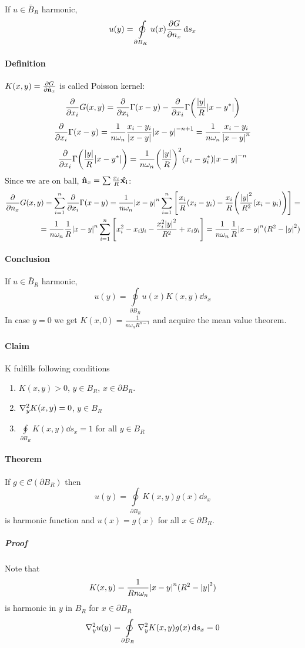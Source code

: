 If $u \in \bar{B}_R$ harmonic,
$$u(y) = \oint\limits_{\partial B_R} u(x) \pdv{G}{n_x} (x,y) \dd{s_x}$$

\paragraph{Definition} $K(x,y) = \pdv{G}{\vu{n}_x} (x,y)$ is called Poisson kernel:
$$\pdv{x_i} G(x,y) = \pdv{x_i} \Gamma(x-y) - \pdv{x_i} \Gamma\qty(\frac{\abs{y}}{R} \abs{x-y^*})$$
$$\pdv{x_i} \Gamma(x-y) = \frac{1}{n\omega_n} \frac{x_i-y_i}{\abs{x-y}} \abs{x-y}^{-n+1} = \frac{1}{n\omega_n}\frac{x_i-y_i}{\abs{x-y}^n}$$ 
$$\pdv{x_i} \Gamma\qty(\frac{\abs{y}}{R} \abs{x-y^*}) = \frac{1}{n\omega_n} \qty(\frac{\abs{y}}{R})^2 (x_i - y^*_i) \abs{x-y}^{-n}$$
Since we are on ball, $\vu{n}_x = \sum \frac{x_i}{R} \vu{x_i}$:
\begin{align*}
\pdv{n_x} G(x,y) = \sum_{i=1}^n \pdv{x_i} \Gamma(x-y) = \frac{1}{n\omega_n} \abs{x-y}^n \sum_{i=1}^n \qty[\frac{x_i}{R}(x_i-y_i) - \frac{x_i}{R}\qty(\frac{\abs{y}^2}{R^2}(x_i-y_i)) ]  =\\= \frac{1}{n\omega_n} \frac{1}{R}\abs{x-y}^n \sum_{i=1}^n \qty[x_i^2 - x_iy_i - \frac{x_i^2\abs{y}^2}{R^2} + x_iy_i ] = \frac{1}{n\omega_n} \frac{1}{R}\abs{x-y}^n(R^2-\abs{y}^2)
\end{align*}
\paragraph{Conclusion}
If $u \in \bar{B}_R$ harmonic,
$$u(y) = \oint\limits_{\partial B_R} u(x) K (x,y) \dd{s_x}$$
In case $y=0$ we get $K(x,0) = \frac{1}{n\omega_n R^{n-1}}$ and acquire the mean value theorem.

\paragraph{Claim}
K fulfills following conditions
\begin{enumerate}
	\item $K(x,y)>0$, $y\in B_R$, $x\in \partial B_R$.
	\item $\laplacian_y K(x,y) = 0$, $y\in B_R$
	\item $\oint\limits_{\partial B_R}  K (x,y) \dd{s_x} = 1$ for all $y\in B_R$
\end{enumerate}

\paragraph{Theorem}
If $g \in \mathcal{C}(\partial B_R)$ then 
$$u(y) = \oint\limits_{\partial B_R}  K (x,y)g(x) \dd{s_x}$$
is harmonic function and $u(x) = g(x) $ for all $x\in \partial B_R$.
\subparagraph{Proof}
Note that
$$K(x,y) = \frac{1}{Rn\omega_n}\abs{x-y}^n(R^2-\abs{y}^2)$$
is harmonic in $y$ in $B_R$ for $x \in \partial B_R$
$$\laplacian_y{u(y)} = \oint\limits_{\partial B_R} \laplacian_y K (x,y)g(x) \dd{s_x} = 0$$

